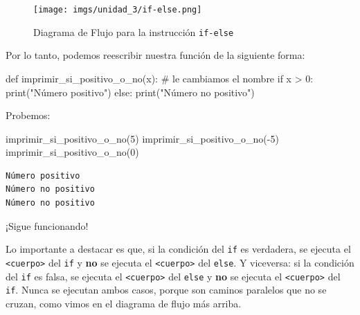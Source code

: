 \documentclass[
  letterpaper,
  DIV=11,
  numbers=noendperiod]{scrreprt}
\newenvironment{Shaded}{\begin{snugshade}}{\end{snugshade}}
\newcommand{\BuiltInTok}[1]{\textcolor[rgb]{0.00,0.23,0.31}{#1}}
\newcommand{\CommentTok}[1]{\textcolor[rgb]{0.37,0.37,0.37}{#1}}
\newcommand{\ControlFlowTok}[1]{\textcolor[rgb]{0.00,0.23,0.31}{#1}}
\newcommand{\DecValTok}[1]{\textcolor[rgb]{0.68,0.00,0.00}{#1}}
\newcommand{\KeywordTok}[1]{\textcolor[rgb]{0.00,0.23,0.31}{#1}}
\newcommand{\NormalTok}[1]{\textcolor[rgb]{0.00,0.23,0.31}{#1}}
\newcommand{\OperatorTok}[1]{\textcolor[rgb]{0.37,0.37,0.37}{#1}}
\newcommand{\StringTok}[1]{\textcolor[rgb]{0.13,0.47,0.30}{#1}}
\begin{document}
\begin{figure}[H]

{\centering \texttt{[image: imgs/unidad\_3/if-else.png]}

}

\caption{Diagrama de Flujo para la instrucción \texttt{if-else}}

\end{figure}%

Por lo tanto, podemos reescribir nuestra función de la siguiente forma:

\begin{Shaded}
\begin{Highlighting}[]
\KeywordTok{def}\NormalTok{ imprimir\_si\_positivo\_o\_no(x): }\CommentTok{\# le cambiamos el nombre}
  \ControlFlowTok{if}\NormalTok{ x }\OperatorTok{\textgreater{}} \DecValTok{0}\NormalTok{:}
      \BuiltInTok{print}\NormalTok{(}\StringTok{"Número positivo"}\NormalTok{)}
  \ControlFlowTok{else}\NormalTok{:}
      \BuiltInTok{print}\NormalTok{(}\StringTok{"Número no positivo"}\NormalTok{)}
\end{Highlighting}
\end{Shaded}

Probemos:

\begin{Shaded}
\begin{Highlighting}[]
\NormalTok{imprimir\_si\_positivo\_o\_no(}\DecValTok{5}\NormalTok{)}
\NormalTok{imprimir\_si\_positivo\_o\_no(}\OperatorTok{{-}}\DecValTok{5}\NormalTok{)}
\NormalTok{imprimir\_si\_positivo\_o\_no(}\DecValTok{0}\NormalTok{)}
\end{Highlighting}
\end{Shaded}

\begin{verbatim}
Número positivo
Número no positivo
Número no positivo
\end{verbatim}

¡Sigue funcionando!

Lo importante a destacar es que, si la condición del \texttt{if} es
verdadera, se ejecuta el \texttt{\textless{}cuerpo\textgreater{}} del
\texttt{if} y \textbf{no} se ejecuta el
\texttt{\textless{}cuerpo\textgreater{}} del \texttt{else}. Y viceversa:
si la condición del \texttt{if} es falsa, se ejecuta el
\texttt{\textless{}cuerpo\textgreater{}} del \texttt{else} y \textbf{no}
se ejecuta el \texttt{\textless{}cuerpo\textgreater{}} del \texttt{if}.
Nunca se ejecutan ambos casos, porque son caminos paralelos que no se
cruzan, como vimos en el diagrama de flujo más arriba.
\end{document}
